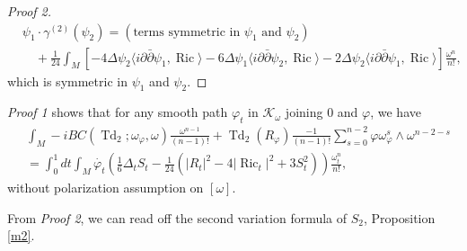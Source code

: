 \documentclass[12pt,reqno,a4paper]{amsart}
\numberwithin{equation}{section}
\def\p{\partial}
\def\bp{\bar\partial}
\DeclareMathOperator{\Td}{Td}
\DeclareMathOperator{\ric}{Ric}
\theoremstyle{remark}
\theoremstyle{dotless}
\begin{document}
\begin{proof}[Proof 2]
\begin{align*}
&\psi_1\cdot\gamma^{(2)}(\psi_2)=\left(\text{terms symmetric in $\psi_1$ and $\psi_2$} \right) \nonumber\\
&\quad +\frac{1}{24}\int_M \left[ -4\Delta\psi_2\langle i\p\bp\psi_1,\ric \rangle -6\Delta\psi_1\langle i\p\bp\psi_2,\ric \rangle -2\Delta\psi_2\langle i\p\bp\psi_1,\ric \rangle \right] \frac{\omega^n}{n!},
\end{align*}
which is symmetric in $\psi_1$ and $\psi_2$.
\end{proof}


\textit{Proof 1} shows that for any smooth path $\varphi_t$ in $\mathcal{K}_\omega$ joining $0$ and $\varphi$, we have
\begin{align*}
&\int_M -i BC(\Td_2;\omega_\varphi,\omega)\frac{\omega^{n-1}}{(n-1)!}+\Td_{2}(R_\varphi)\frac{-1}{(n-1)!}\sum^{n-2}_{s=0}\varphi \omega_{\varphi}^s\wedge \omega^{n-2-s} \\
&= \int_0^1 dt \int_M \dot{\varphi_t}\left( \frac{1}{6}\Delta_t S_t-\frac{1}{24}\left(|R_t|^2-4|\ric_t|^2+3S_t^2\right) \right)\frac{\omega_t^n}{n!},
\end{align*}
without polarization assumption on $[\omega]$. 


From \textit{Proof 2}, we can read off the second variation formula of $S_2$, Proposition \ref{m2}.




\end{document}
